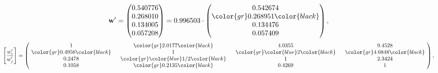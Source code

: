 \begin{example}
\begin{equation*}
\mathbf{w}^{\prime} =
\begin{pmatrix}
0.540776\\
0.268010\\
0.134005\\
0.057208
\end{pmatrix} =
0.996503\cdot
\begin{pmatrix}
0.542674\\
\color{gr} 0.268951\color{black} \\
0.134476\\
0.057409
\end{pmatrix},
\end{equation*}
\begin{equation*}
\left[ \frac{{w}^{\prime}_i}{{w}^{\prime}_j} \right] =
\begin{pmatrix}
$\,\,$ 1 $\,\,$ & $\,\,$\color{gr} 2.0177\color{black} $\,\,$ & $\,\,$4.0355$\,\,$ & $\,\,$9.4528$\,\,$ \\
$\,\,$\color{gr} 0.4956\color{black} $\,\,$ & $\,\,$ 1 $\,\,$ & $\,\,$\color{gr} \color{blue} 2\color{black} $\,\,$ & $\,\,$\color{gr} 4.6848\color{black}   $\,\,$ \\
$\,\,$0.2478$\,\,$ & $\,\,$\color{gr} \color{blue}  1/2\color{black} $\,\,$ & $\,\,$ 1 $\,\,$ & $\,\,$2.3424 $\,\,$ \\
$\,\,$0.1058$\,\,$ & $\,\,$\color{gr} 0.2135\color{black} $\,\,$ & $\,\,$0.4269$\,\,$ & $\,\,$ 1  $\,\,$ \\
\end{pmatrix},
\end{equation*}
\end{example}
\newpage
